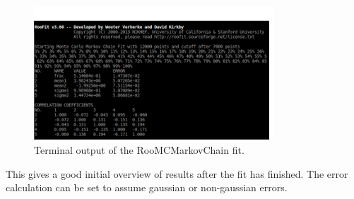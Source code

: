 \documentclass[english]{uzhpub}
\begin{document}
\begin{figure}[H]
  \centering
  \includegraphics[width=0.8\textwidth]{RooMCMC/terminal_output}
  \caption{Terminal output of the RooMCMarkovChain fit.}
  \label{fig:terminal}
\end{figure}
This gives a good initial overview of results after the fit has finished. The error calculation can be set to assume gaussian or non-gaussian errors.
\end{document}
